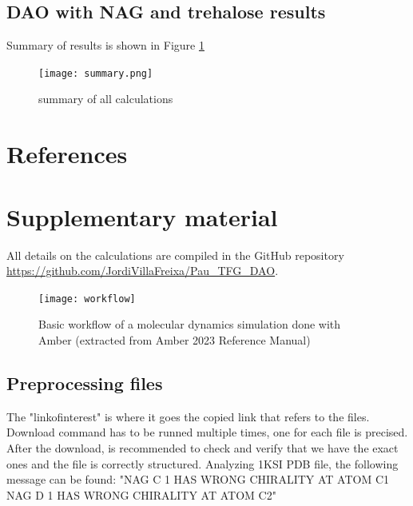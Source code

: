 \documentclass[a4paper]{article}
\begin{document}
\subsection{DAO with NAG and trehalose results}

Summary of results is shown in Figure \ref{Fig:summary}
	
\begin{figure}[htbp]
    \centering
    \texttt{[image: summary.png]}
    \caption{summary of all calculations}
    \label{Fig:summary}
\end{figure}
\newpage
\section{References}

\newpage
\appendix


\section{Supplementary material}

\setcounter{figure}{0}%
\let\oldthefigure\thefigure%
\renewcommand{\thefigure}{S\oldthefigure}%

All details on the calculations are compiled in the GitHub repository \href{https://github.com/JordiVillaFreixa/Pau\_TFG\_DAO}{https://github.com/JordiVillaFreixa/Pau\_TFG\_DAO}.


\begin{figure}[h]
\centering
\texttt{[image: workflow]}
\caption{Basic workflow of a molecular dynamics simulation done with Amber (extracted from Amber 2023 Reference Manual)}
\label{fig:workflow}
\end{figure}

\subsection{Preprocessing files}

    
The "linkofinterest" is where it goes the copied link that refers to the files. Download command has to be runned multiple times, one for each file is precised.
After the download, is recommended to check and verify that we have the exact ones and the file is correctly structured. Analyzing 1KSI PDB file, the following message can be found: "NAG C 1 HAS WRONG CHIRALITY AT ATOM C1 NAG D 1 HAS WRONG CHIRALITY AT ATOM C2" 
\end{document}
